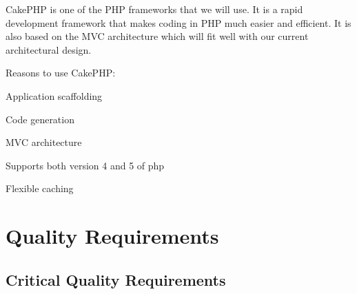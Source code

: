 \documentclass[a4paper,12pt]{report}
\begin{document}
\begin{description}
\item CakePHP is one of the PHP frameworks that we will use. It is a rapid development framework that makes coding in PHP much easier and efficient. It is also based on the MVC architecture which will fit well with our current architectural design. 
\item Reasons to use CakePHP:
\item[$\bullet$]Application scaffolding
\item[$\bullet$]Code generation
\item[$\bullet$] MVC architecture
\item[$\bullet$]Supports both version 4 and 5 of php
\item[$\bullet$]Flexible caching

\end{description}
\newpage
\section{Quality Requirements}
	\subsection{Critical Quality Requirements}
\end{document}
